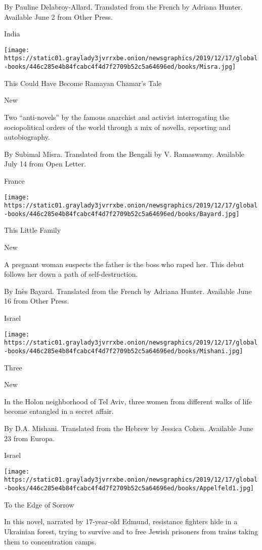  By Pauline Delabroy-Allard. Translated from the French by Adriana
Hunter. Available June 2 from Other Press.

India

\texttt{[image: https://static01.graylady3jvrrxbe.onion/newsgraphics/2019/12/17/global-books/446c285e4b84fcabc4f4d7f2709b52c5a64696ed/books/Misra.jpg]}

This Could Have Become Ramayan Chamar's Tale

New

Two ``anti-novels'' by the famous anarchist and activist interrogating
the sociopolitical orders of the world through a mix of novella,
reporting and autobiography.

 By Subimal Misra. Translated from the Bengali by V. Ramaswamy.
Available July 14 from Open Letter.

France

\texttt{[image: https://static01.graylady3jvrrxbe.onion/newsgraphics/2019/12/17/global-books/446c285e4b84fcabc4f4d7f2709b52c5a64696ed/books/Bayard.jpg]}

This Little Family

New

A pregnant woman suspects the father is the boss who raped her. This
debut follows her down a path of self-destruction.

 By Inès Bayard. Translated from the French by Adriana Hunter. Available
June 16 from Other Press.

Israel

\texttt{[image: https://static01.graylady3jvrrxbe.onion/newsgraphics/2019/12/17/global-books/446c285e4b84fcabc4f4d7f2709b52c5a64696ed/books/Mishani.jpg]}

Three

New

In the Holon neighborhood of Tel Aviv, three women from different walks
of life become entangled in a secret affair.

 By D.A. Mishani. Translated from the Hebrew by Jessica Cohen. Available
June 23 from Europa.

Israel

\texttt{[image: https://static01.graylady3jvrrxbe.onion/newsgraphics/2019/12/17/global-books/446c285e4b84fcabc4f4d7f2709b52c5a64696ed/books/Appelfeld1.jpg]}

To the Edge of Sorrow

In this novel, narrated by 17-year-old Edmund, resistance fighters hide
in a Ukrainian forest, trying to survive and to free Jewish prisoners
from trains taking them to concentration camps.

